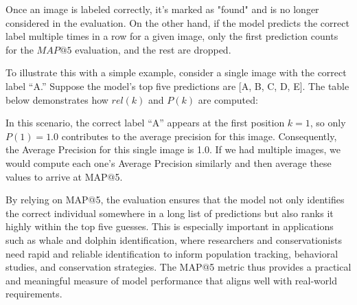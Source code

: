 \documentclass[twocolumn]{article}
\begin{document}
Once an image is labeled correctly, it's marked as "found" and is no longer considered in the evaluation. On the other hand, if the model predicts the correct label multiple times in a row for a given image, only the first prediction counts for the \(MAP@5\) evaluation, and the rest are dropped.

To illustrate this with a simple example, consider a single image with the correct label “A.” Suppose the model’s top five predictions are [A, B, C, D, E]. The table below demonstrates how \( rel(k) \) and \( P(k) \) are computed:

\begin{table}[ht!]
\centering
\renewcommand{\arraystretch}{1.5} %
\caption{Example computation of \( rel(k) \) and \( P(k) \) for an image with the correct label “A.” The first prediction is correct, so \( rel(k) \) is 1 for \( k = 1 \), and subsequent predictions contribute 0.}
\label{tab:map5_example}
\end{table}

In this scenario, the correct label “A” appears at the first position \( k=1 \), so only \( P(1) = 1.0 \) contributes to the average precision for this image. Consequently, the Average Precision for this single image is 1.0. If we had multiple images, we would compute each one’s Average Precision similarly and then average these values to arrive at MAP@5.

By relying on MAP@5, the evaluation ensures that the model not only identifies the correct individual somewhere in a long list of predictions but also ranks it highly within the top five guesses. This is especially important in applications such as whale and dolphin identification, where researchers and conservationists need rapid and reliable identification to inform population tracking, behavioral studies, and conservation strategies. The MAP@5 metric thus provides a practical and meaningful measure of model performance that aligns well with real-world requirements.
\end{document}
